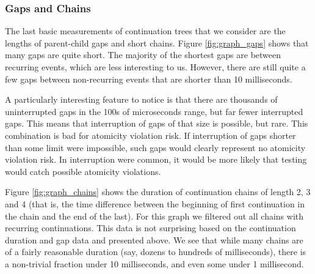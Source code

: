 \documentclass[acmsmall,anonymous,review]{acmart}\settopmatter{printfolios=true,printccs=false,printacmref=false}
\begin{document}
\subsubsection{Gaps and Chains}

The last basic measurements of continuation trees that we consider are the lengths of parent-child gaps and short chains.
Figure \ref{fig:graph_gaps} shows that many gaps are quite short.
The majority of the shortest gaps are between recurring events, which are less interesting to us.
However, there are still quite a few gaps between non-recurring events that are shorter than 10 milliseconds.

A particularly interesting feature to notice is that there are thousands of uninterrupted gaps in the 100s of microseconds range, but far fewer interrupted gaps.
This means that interruption of gaps of that size is possible, but rare.
This combination is bad for atomicity violation risk.
If interruption of gaps shorter than some limit were impossible, such gaps would clearly represent no atomicity violation risk.
In interruption were common, it would be more likely that testing would catch possible atomicity violations.

Figure \ref{fig:graph_chains} shows the duration of continuation chains of length 2, 3 and 4 (that is, the time difference between the beginning of first continuation in the chain and the end of the last).
For this graph we filtered out all chains with recurring continuations.
This data is not surprising based on the continuation duration and gap data and presented above.
We see that while many chains are of a fairly reasonable duration (say, dozens to hundreds of milliseconds), there is a non-trivial fraction under 10 milliseconds, and even some under 1 millisecond.
\end{document}
